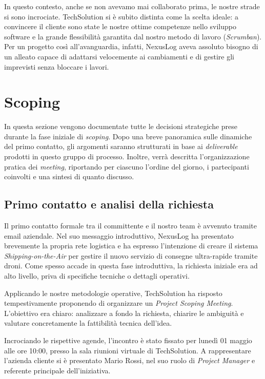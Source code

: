 \documentclass[12pt, a4paper]{article}
\begin{document}
In questo contesto, anche se non avevamo mai collaborato prima, le nostre strade si sono incrociate. TechSolution si è subito distinta come la scelta ideale: a convincere il cliente sono state le nostre ottime competenze nello sviluppo software e la grande flessibilità garantita dal nostro metodo di lavoro (\textit{Scrumban}). Per un progetto così all'avanguardia, infatti, NexusLog aveva assoluto bisogno di un alleato capace di adattarsi velocemente ai cambiamenti e di gestire gli imprevisti senza bloccare i lavori.

\newpage

\section{Scoping}
In questa sezione vengono documentate tutte le decisioni strategiche prese durante la fase iniziale di \textit{scoping}. Dopo una breve panoramica sulle dinamiche del primo contatto, gli argomenti saranno strutturati in base ai \textit{deliverable} prodotti in questo gruppo di processo. Inoltre, verrà descritta l'organizzazione pratica dei \textit{meeting}, riportando per ciascuno l'ordine del giorno, i partecipanti coinvolti e una sintesi di quanto discusso.

\subsection{Primo contatto e analisi della richiesta}
Il primo contatto formale tra il committente e il nostro team è avvenuto tramite email aziendale. Nel suo messaggio introduttivo, NexusLog ha presentato brevemente la propria rete logistica e ha espresso l'intenzione di creare il sistema \textit{Shipping-on-the-Air} per gestire il nuovo servizio di consegne ultra-rapide tramite droni. Come spesso accade in questa fase introduttiva, la richiesta iniziale era ad alto livello, priva di specifiche tecniche o dettagli operativi.

Applicando le nostre metodologie operative, TechSolution ha risposto tempestivamente proponendo di organizzare un \textit{Project Scoping Meeting}. L'obiettivo era chiaro: analizzare a fondo la richiesta, chiarire le ambiguità e valutare concretamente la fattibilità tecnica dell'idea. 

Incrociando le rispettive agende, l'incontro è stato fissato per lunedì 01 maggio alle ore 10:00, presso la sala riunioni virtuale di TechSolution. A rappresentare l'azienda cliente si è presentato Mario Rossi, nel suo ruolo di \textit{Project Manager} e referente principale dell'iniziativa.
\end{document}
